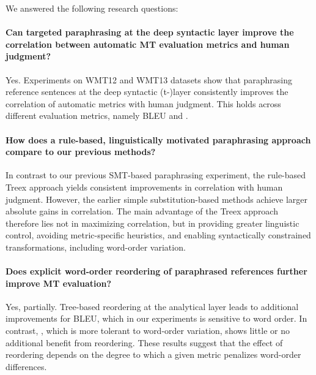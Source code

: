 \begin{mdframed}[
    linecolor=gray,
    linewidth=2pt,
    roundcorner=5,
    backgroundcolor=gray!5
]
\noindent
We answered the following research questions:

\paragraph{Can targeted paraphrasing at the deep syntactic layer improve the correlation between automatic MT evaluation metrics and human judgment?} 
Yes. Experiments on WMT12 and WMT13 datasets show that paraphrasing reference sentences at the deep syntactic (t-)layer consistently improves the correlation of automatic metrics with human judgment. This holds across different evaluation metrics, namely BLEU and \mn.

\paragraph{How does a rule-based, linguistically motivated paraphrasing approach compare to our previous methods?}
In contrast to our previous SMT-based paraphrasing experiment, the rule-based Treex approach yields consistent improvements in correlation with human judgment. However, the earlier simple substitution-based methods achieve larger absolute gains in correlation. The main advantage of the Treex approach therefore lies not in maximizing correlation, but in providing greater linguistic control, avoiding metric-specific heuristics, and enabling syntactically constrained transformations, including word-order variation.

\paragraph{Does explicit word-order reordering of paraphrased references further improve MT evaluation?}
Yes, partially. Tree-based reordering at the analytical layer leads to additional improvements for BLEU, which in our experiments is sensitive to word order. In contrast, \mn, which is more tolerant to word-order variation, shows little or no additional benefit from reordering. These results suggest that the effect of reordering depends on the degree to which a given metric penalizes word-order differences.

\end{mdframed}
